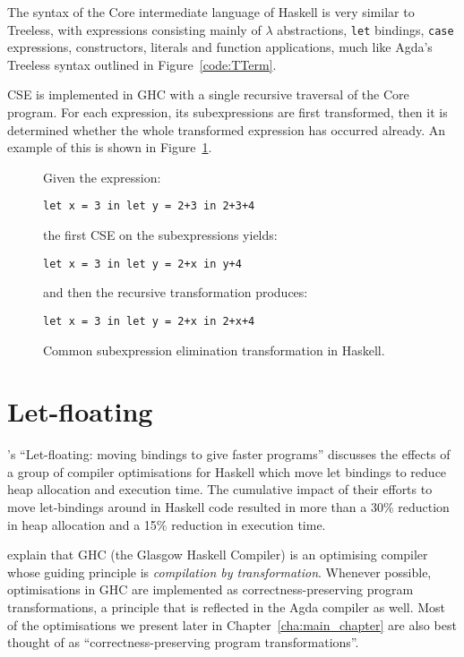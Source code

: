 The syntax of the Core intermediate language of Haskell is very similar to Treeless, with expressions consisting mainly of $\lambda$ abstractions, \lstinline{let} bindings, \lstinline{case} expressions, constructors, literals and function applications, much like Agda's Treeless syntax outlined in Figure~\ref{code:TTerm}.

CSE is implemented in GHC with a single recursive traversal of the Core program. For each expression, its subexpressions are first transformed, then it is determined whether the whole transformed expression has occurred already.\citep{Chitil-1998} An example of this is shown in Figure~\ref{code:cse_haskell}.

\begin{figure}[h]
Given the expression:

\lstinline{let x = 3 in let y = 2+3 in 2+3+4}

the first CSE on the subexpressions yields:

\lstinline{let x = 3 in let y = 2+x in y+4}

and then the recursive transformation produces:

\lstinline{let x = 3 in let y = 2+x in 2+x+4}

\caption{Common subexpression elimination transformation in Haskell.\citep{Chitil-1998}}
\label{code:cse_haskell}
\end{figure}

\section{Let-floating}
\label{sec:let_floating}

\citet{jones1996}'s ``Let-floating: moving bindings to give faster programs'' discusses the effects of a group of compiler optimisations for Haskell which move let bindings to reduce heap allocation and execution time. The cumulative impact of their efforts to move let-bindings around in Haskell code resulted in more than a 30\% reduction in heap allocation and a 15\% reduction in execution time.

\citet{jones1996} explain that GHC (the Glasgow Haskell Compiler) is an optimising compiler whose guiding principle is \textit{compilation by transformation}. Whenever possible, optimisations in GHC are implemented as correctness-preserving program transformations, a principle that is reflected in the Agda compiler as well. Most of the optimisations we present later in Chapter~\ref{cha:main_chapter} are also best thought of as ``correctness-preserving program transformations''.

